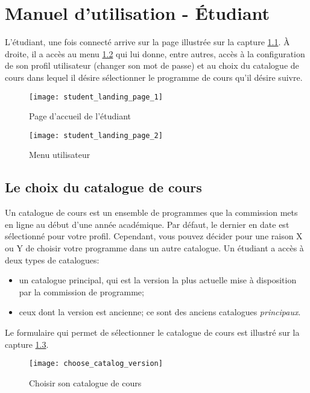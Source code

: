 \chapter{Manuel d'utilisation - Étudiant}
L'étudiant, une fois connecté arrive sur la page illustrée sur la capture \ref{fig:student_landing_page_manual}. À droite, il a accès au menu \ref{fig:user_menu} qui lui donne, entre autres, accès à la configuration de son profil utilisateur (changer son mot de passe) et au choix du catalogue de cours dans lequel il désire sélectionner le programme de cours qu'il désire suivre. 
\begin{figure}[htb]
\centering
\caption{Page d’accueil de l'étudiant}
\label{fig:student_landing_page_manual}
\texttt{[image: student\_landing\_page\_1]}
\end{figure}

\begin{figure}[htb]
\centering
\caption{Menu utilisateur}
\label{fig:user_menu}
\texttt{[image: student\_landing\_page\_2]}
\end{figure}
\section{Le choix du catalogue de cours}
Un catalogue de cours est un ensemble de programmes que la commission mets en ligne au début d'une année académique. Par défaut, le dernier en date est sélectionné pour votre profil. Cependant, vous pouvez décider pour une raison X ou Y de choisir votre programme dans un autre catalogue. Un étudiant a accès à deux types de catalogues: 


\begin{itemize}
\item un catalogue principal, qui est la version la plus actuelle mise à disposition par la commission de programme;
\item ceux dont la version est ancienne; ce sont des anciens catalogues \textit{principaux}.
\end{itemize}

Le formulaire qui permet de sélectionner le catalogue de cours est illustré sur la capture \ref{fig:choose_catalog_version}.

\begin{figure}
\centering
\caption{Choisir son catalogue de cours}
\label{fig:choose_catalog_version}
\texttt{[image: choose\_catalog\_version]}
\end{figure}

